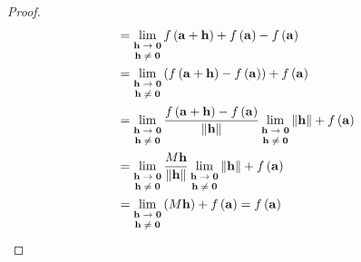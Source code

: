 \documentclass[dvipdfmx]{jsarticle}
\begin{document}
\begin{proof}
\begin{align*}
&= \lim_{\scriptsize \begin{matrix}
\mathbf{h} \rightarrow \mathbf{0} \\
\mathbf{h} \neq \mathbf{0} \\
\end{matrix}}{f\left( \mathbf{a} + \mathbf{h} \right)} + f\left( \mathbf{a} \right) - f\left( \mathbf{a} \right)\\
&= \lim_{\scriptsize \begin{matrix}
\mathbf{h} \rightarrow \mathbf{0} \\
\mathbf{h} \neq \mathbf{0} \\
\end{matrix}}\left( f\left( \mathbf{a} + \mathbf{h} \right) - f\left( \mathbf{a} \right) \right) + f\left( \mathbf{a} \right)\\
&= \lim_{\scriptsize \begin{matrix}
\mathbf{h} \rightarrow \mathbf{0} \\
\mathbf{h} \neq \mathbf{0} \\
\end{matrix}}\frac{f\left( \mathbf{a} + \mathbf{h} \right) - f\left( \mathbf{a} \right)}{\left\| \mathbf{h} \right\|}\lim_{\scriptsize \begin{matrix}
\mathbf{h} \rightarrow \mathbf{0} \\
\mathbf{h} \neq \mathbf{0} \\
\end{matrix}}\left\| \mathbf{h} \right\| + f\left( \mathbf{a} \right)\\
&= \lim_{\scriptsize \begin{matrix}
\mathbf{h} \rightarrow \mathbf{0} \\
\mathbf{h} \neq \mathbf{0} \\
\end{matrix}}\frac{M\mathbf{h}}{\left\| \mathbf{h} \right\|}\lim_{\scriptsize \begin{matrix}
\mathbf{h} \rightarrow \mathbf{0} \\
\mathbf{h} \neq \mathbf{0} \\
\end{matrix}}\left\| \mathbf{h} \right\| + f\left( \mathbf{a} \right)\\
&= \lim_{\scriptsize \begin{matrix}
\mathbf{h} \rightarrow \mathbf{0} \\
\mathbf{h} \neq \mathbf{0} \\
\end{matrix}}\left( M\mathbf{h} \right) + f\left( \mathbf{a} \right) = f\left( \mathbf{a} \right)

\end{align*}
\end{proof}
\end{document}
